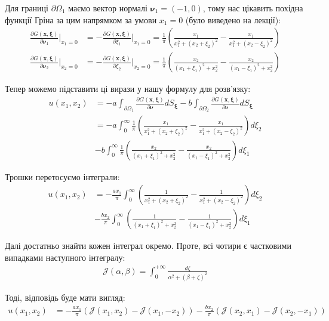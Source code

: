 \documentclass{hw_template}
\begin{document}
Для границі $\partial \Omega_1$ маємо вектор нормалі $\boldsymbol{\nu}_1 = (-1,0)$, тому нас цікавить
похідна функції Гріна за цим напрямком за умови $x_1 = 0$ (було виведено на лекції):
\begin{align*}
    \frac{\partial G(\mathbf{x}, \boldsymbol{\xi})}{\partial \boldsymbol{\nu}_1}\Big|_{x_1=0} &= -\frac{\partial G(\mathbf{x}, \boldsymbol{\xi})}{\partial \xi_1}\Big|_{x_1=0} = \frac{1}{\pi}\left(\frac{x_1}{x_1^2+(x_2+\xi_2)^2} - \frac{x_1}{x_1^2+(x_2-\xi_2)^2}\right) \\
    \frac{\partial G(\mathbf{x}, \boldsymbol{\xi})}{\partial \boldsymbol{\nu}_2}\Big|_{x_2=0} &= -\frac{\partial G(\mathbf{x}, \boldsymbol{\xi})}{\partial \xi_2}\Big|_{x_2=0} = \frac{1}{\pi}\left(\frac{x_2}{(x_1+\xi_1)^2+x_2^2} - \frac{x_2}{(x_1-\xi_1)^2+x_2^2}\right)
\end{align*}

Тепер можемо підставити ці вирази у нашу формулу для розв'язку:
\begin{align*}
    u(x_1,x_2) &= -a\int_{\partial \Omega_1} \frac{\partial G(\mathbf{x},\boldsymbol{\xi})}{\partial \boldsymbol{\nu}}dS_{\boldsymbol{\xi}} - b\int_{\partial \Omega_2} \frac{\partial G(\mathbf{x},\boldsymbol{\xi})}{\partial \boldsymbol{\nu}}dS_{\boldsymbol{\xi}} \\
    &= -a\int_{0}^{\infty} \frac{1}{\pi}\left(\frac{x_1}{x_1^2+(x_2+\xi_2)^2} - \frac{x_1}{x_1^2+(x_2-\xi_2)^2}\right)d\xi_2 \\
    & -b\int_{0}^{\infty} \frac{1}{\pi}\left(\frac{x_2}{(x_1+\xi_1)^2+x_2^2} - \frac{x_2}{(x_1-\xi_1)^2+x_2^2}\right)d\xi_1
\end{align*}

Трошки перетосуємо інтеграли:
\begin{align*}
    u(x_1,x_2) &= -\frac{ax_1}{\pi}\int_{0}^{\infty}\left(\frac{1}{x_1^2+(x_2+\xi_2)^2} - \frac{1}{x_1^2+(x_2-\xi_2)^2}\right)d\xi_2 \\
    &- \frac{bx_2}{\pi}\int_{0}^{\infty} \left(\frac{1}{(x_1+\xi_1)^2+x_2^2} - \frac{1}{(x_1-\xi_1)^2+x_2^2}\right)d\xi_1
\end{align*}

Далі достатньо знайти кожен інтеграл окремо. Проте, всі чотири є частковими випадками наступного інтегралу:
\begin{align*}
    \mathcal{J}(\alpha,\beta) = \int_0^{+\infty} \frac{d\zeta}{\alpha^2 + (\beta + \zeta)^2}
\end{align*}

Тоді, відповідь буде мати вигляд:
\begin{align*}
    u(x_1,x_2) &= -\frac{ax_1}{\pi}\left(\mathcal{J}(x_1,x_2) - \mathcal{J}(x_1,-x_2)\right) - \frac{bx_2}{\pi}\left(\mathcal{J}(x_2,x_1) - \mathcal{J}(x_2,-x_1)\right)
\end{align*}
\end{document}
